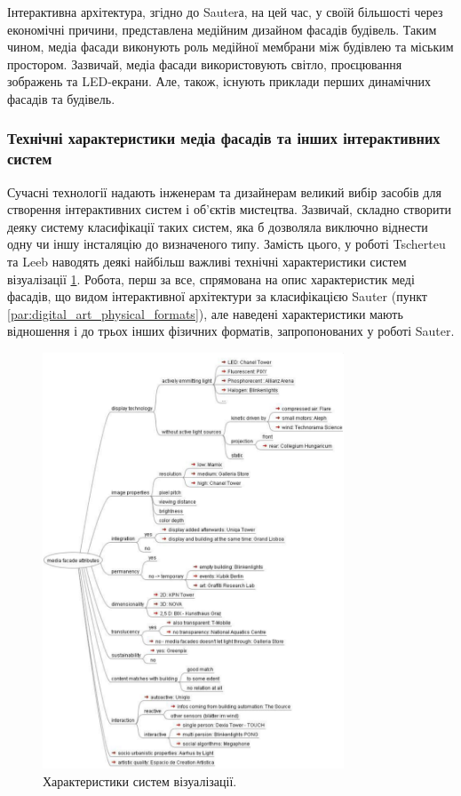 \documentclass[a4paper,ukrainian,utf8,nocolumnsxix,floatsection,equationsection]{eskdtext}
\renewcommand\paragraph{\subsubsection}
\begin{document}
Інтерактивна архітектура, згідно до Sauterа, на цей час, у своїй більшості через економічні причини, представлена медійним дизайном фасадів будівель. Таким чином, медіа фасади виконують роль медійної мембрани між будівлею та міським простором. Зазвичай, медіа фасади використовують світло, проєцювання зображень та LED-екрани. Але, також, існують приклади перших динамічних фасадів та будівель.

\paragraph{Технічні характеристики медіа фасадів та інших інтерактивних систем}

Сучасні технології надають інженерам та дизайнерам великий вибір засобів для створення інтерактивних систем і об’єктів мистецтва. Зазвичай, складно створити деяку систему класифікації таких систем, яка б дозволяла виключно віднести одну чи іншу інсталяцію до визначеного типу. Замість цього, у роботі \cite{media:facades:fundamentals} Tscherteu та Leeb наводять деякі найбільш важливі технічні характеристики систем візуалізації \ref{fig:media_facade_charateristics}. Робота, перш за все, спрямована на опис характеристик меді фасадів, що видом інтерактивної архітектури за класифікацією Sauter (пункт \ref{par:digital_art_physical_formats}), але наведені характеристики мають відношення і до трьох інших фізичних форматів, запропонованих у роботі Sauter.

\begin{figure}[bth]
	\centering
	\includegraphics[width=0.8\textwidth]{img/media_facade_charateristics.png}
	\caption{\label{fig:media_facade_charateristics}{Характеристики систем візуалізації}.}
\end{figure} 
\end{document}
